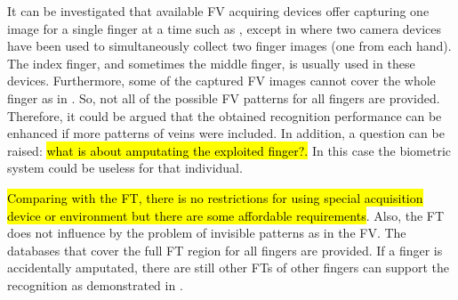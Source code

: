 \documentclass[review]{elsarticle}
\begin{document}
	It can be investigated that available FV acquiring devices offer capturing one image for a single finger at a time such as \cite{Zhang2006Multiscale,Wang2010User,Kang2010Multimodal,Kumar2012Human,Liu2012AnEmbedded}, except in \cite{Lu2014Finger} where two camera devices have been used to simultaneously collect two finger images (one from each hand). The index finger, and sometimes the middle finger, is usually used in these devices. Furthermore, some of the captured FV images cannot cover the whole finger as in \cite{Kang2010Multimodal,Wang2010User}. So, not all of the possible FV patterns for all fingers are provided. Therefore, it could be argued that the obtained recognition performance can be enhanced if more patterns of veins were included. In addition, a question can be raised: \hl{what is about amputating the exploited finger?.} In this case the biometric system could be useless for that individual.
	
	\hl{Comparing with the FT, there is no restrictions for using special acquisition device or environment but there are some affordable requirements}. Also, the FT does not influence by the problem of invisible patterns as in the FV. The databases that cover the full FT region for all fingers are provided. If a finger is accidentally amputated, there are still other FTs of other fingers can support the recognition as demonstrated in \cite{Al-Nima2017Robust,Al-Nima2017finger}.
\end{document}
